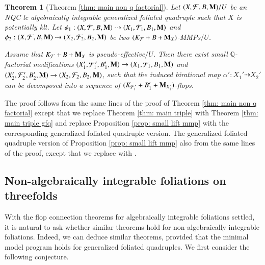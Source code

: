 \documentclass[preprint,12pt]{elsarticle}
\newcommand{\Mm}{{\bf{M}}}
\newcommand{\Qq}{\mathbb{Q}}
\newcommand{\Ff}{\mathcal{F}}
\newtheorem{thm}{Theorem}[section]
\begin{document}
\begin{thm}[Theorem \ref{thm: main non q factorial}]\label{thm: main non q factorial gfq}
Let $(X,\Ff,B,\Mm)/U$ be an NQC lc algebraically integrable generalized foliated quadruple such that $X$ is potentially klt. Let $\phi_1: (X,\Ff,B,\Mm)\dashrightarrow (X_1,\Ff_1,B_1,\Mm)$ and $\phi_2: (X,\Ff,B,\Mm)\dashrightarrow (X_2,\Ff_2,B_2,\Mm)$ be two $(K_{\Ff}+B+\Mm_X)$-MMPs$/U$. 

Assume that $K_{\Ff}+B+\Mm_X$ is pseudo-effective$/U$. Then there exist small $\Qq$-factorial modifications $(X_1',\Ff_1',B_1',\Mm)\rightarrow (X_1,\Ff_1,B_1,\Mm)$ and $(X_2',\Ff_2',B_2',\Mm)\rightarrow (X_2,\Ff_2,B_2,\Mm)$, such that the induced birational map $\alpha': X_1'\dashrightarrow X_2'$ can be decomposed into a sequence of $(K_{\Ff_1'}+B_1'+\Mm_{X_1'})$-flops.
\end{thm}
\begin{pf}
    The proof follows from the same lines of the proof of Theorem \ref{thm: main non q factorial} except that we replace Theorem \ref{thm: main triple} with Theorem \ref{thm: main triple gfq} and replace Proposition \ref{prop: small lift mmp} with the corresponding generalized foliated quadruple version. The generalized foliated quadruple version of Proposition \ref{prop: small lift mmp} also from the same lines of the proof, except that we replace \cite[Theorem 1.11]{LMX24b} with \cite[Theorem A.13]{LMX24b}.
\end{pf}

\subsection{Non-algebraically integrable foliations on threefolds}

With the flop connection theorems for algebraically integrable foliations settled, it is natural to ask whether similar theorems hold for non-algebraically integrable foliations. Indeed, we can deduce similar theorems, provided that the minimal model program holds for generalized foliated quadruples. We first consider the following conjecture.
\end{document}
